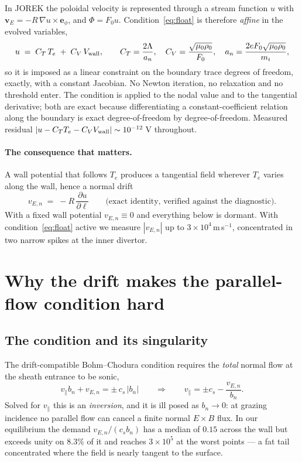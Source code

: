 \documentclass[11pt,a4paper]{article}
\newcommand{\vpar}{v_\parallel}
\newcommand{\cs}{c_s}
\newcommand{\vEn}{v_{E,n}}
\begin{document}
In JOREK the poloidal velocity is represented through a stream function $u$ with
$\bm{v}_{E} = -R\,\nabla u\times \bm{e}_\phi$, and $\Phi = F_0 u$. Condition~\eqref{eq:float} is
therefore \emph{affine} in the evolved variables,
\begin{equation}
u \;=\; C_T\,T_e \;+\; C_V\,V_{\rm wall},
\qquad
C_T=\frac{2\Lambda}{a_n},\quad
C_V=\frac{\sqrt{\mu_0\rho_0}}{F_0},\quad
a_n=\frac{2eF_0\sqrt{\mu_0\rho_0}}{m_i},
\label{eq:affine}
\end{equation}
so it is imposed as a linear constraint on the boundary trace degrees of freedom, exactly, with a
constant Jacobian. No Newton iteration, no relaxation and no threshold enter. The condition is
applied to the nodal value and to the tangential derivative; both are exact because differentiating
a constant-coefficient relation along the boundary is exact degree-of-freedom by
degree-of-freedom. Measured residual $|u-C_TT_e-C_VV_{\rm wall}| \sim 10^{-12}\,$V throughout.

\paragraph{The consequence that matters.} A wall potential that follows $T_e$ produces a tangential
field wherever $T_e$ varies along the wall, hence a normal drift
\begin{equation}
\vEn \;=\; -R\,\frac{\partial u}{\partial \ell}
\qquad\text{(exact identity, verified against the diagnostic).}
\end{equation}
With a fixed wall potential $\vEn\equiv 0$ and everything below is dormant. With
condition~\eqref{eq:float} active we measure $|\vEn|$ up to $3\times10^{4}\,$m\,s$^{-1}$,
concentrated in two narrow spikes at the inner divertor.

\section{Why the drift makes the parallel-flow condition hard}

\subsection{The condition and its singularity}
The drift-compatible Bohm--Chodura condition requires the \emph{total} normal flow at the sheath
entrance to be sonic,
\begin{equation}
\vpar b_n + \vEn = \pm\, \cs\,|b_n|
\qquad\Longrightarrow\qquad
\vpar = \pm\cs - \frac{\vEn}{b_n}.
\label{eq:bohm}
\end{equation}
Solved for $\vpar$ this is an \emph{inversion}, and it is ill posed as $b_n\to0$: at grazing
incidence no parallel flow can cancel a finite normal $E\times B$ flux. In our equilibrium the
demand $\vEn/(\cs b_n)$ has a median of $0.15$ across the wall but exceeds unity on $8.3\%$ of it
and reaches $3\times10^{5}$ at the worst points --- a fat tail concentrated where the field is
nearly tangent to the surface.
\end{document}

